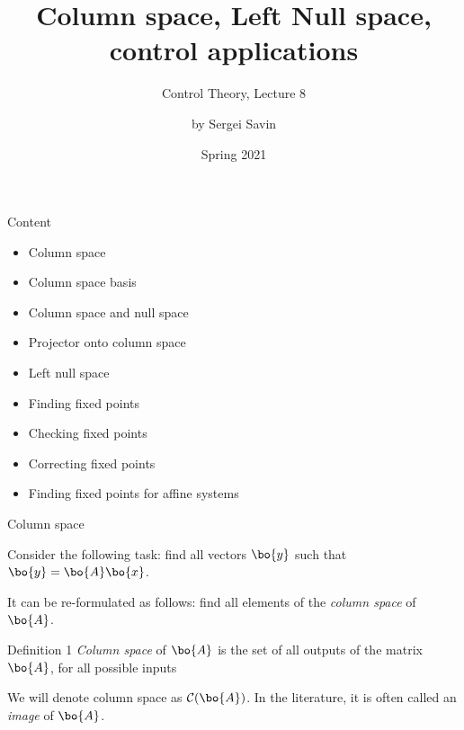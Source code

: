 \documentclass{beamer}
\title{Column space, Left Null space, control applications}
\subtitle{Control Theory, Lecture 8}
\author{by Sergei Savin}
\date{Spring 2021}
\begin{document}
\maketitle


\begin{frame}{Content}

\begin{itemize}
\item Column space
\item Column space basis
\item Column space and null space
\item Projector onto column space
\item Left null space
\item Finding fixed points
\item Checking fixed points
\item Correcting fixed points
\item Finding fixed points for affine systems
\end{itemize}

\end{frame}





\begin{frame}{Column space}
\begin{flushleft}

Consider the following task: find all vectors $\bo{y}$ such that $\bo{y} = \bo{A} \bo{x}$.

\bigskip

It can be re-formulated as follows: find all elements of the \emph{column space} of $\bo{A}$.

\begin{block}{Definition 1}
  \emph{Column space} of $\bo{A}$ is the set of all outputs of the matrix $\bo{A}$, for all possible inputs
\end{block}

\bigskip

We will denote column space as $\mathcal{C}(\bo{A})$. In the literature, it is often called an \emph{image} of $\bo{A}$.

\end{flushleft}
\end{frame}
\end{document}
